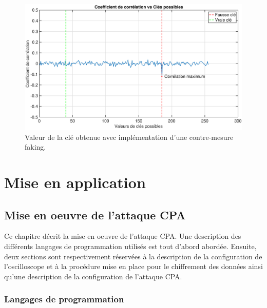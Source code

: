 \documentclass[oneside]{book}
\begin{document}
\begin{figure}[htbp]
    \vspace{-0.6cm}
    \centering
    \includegraphics[scale=0.30]{image/fakingExemple}
    \caption{Valeur de la clé obtenue avec implémentation d'une contre-mesure faking.}
    \label{fig:fakingExemple} 
\end{figure}


\newpage



\part{Mise en application}


\chapter{Mise en oeuvre de l'attaque CPA}
\label{chap:config}

Ce chapitre décrit la mise en oeuvre de l'attaque CPA. Une description des différents langages de programmation utilisés est tout d'abord abordée. Ensuite, deux sections sont respectivement réservées à la description de la configuration de l'oscilloscope et à la procédure mise en place pour le chiffrement des données ainsi qu'une description de la configuration de l'attaque CPA.

\section{Langages de programmation}
\label{sec:langages}
\end{document}
